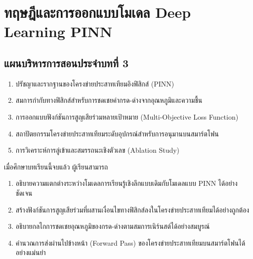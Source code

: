 \chapter{ทฤษฎีและการออกแบบโมเดล Deep Learning PINN}
\label{chap:ch03}

\section*{แผนบริหารการสอนประจำบทที่ 3}

\begin{tcolorbox}[
    enhanced, breakable,
    colback=white, colframe=rbruNavy,
    fonttitle=\bfseries\color{white},
    title={1. หัวข้อเนื้อหาประจำบท},
    arc=1.5mm, boxrule=0.8pt, leftrule=3.5mm
]
\begin{enumerate}
    \item ปรัชญาและรากฐานของโครงข่ายประสาทเทียมอิงฟิสิกส์ (PINN)
    \item สมการกำกับทางฟิสิกส์สำหรับการชดเชยค่ากรด-ด่างจากอุณหภูมิและความชื้น
    \item การออกแบบฟังก์ชันการสูญเสียร่วมหลายเป้าหมาย (Multi-Objective Loss Function)
    \item สถาปัตยกรรมโครงข่ายประสาทเทียมระดับอุปกรณ์สำหรับการอนุมานบนสมาร์ตโฟน
    \item การวิเคราะห์การลู่เข้าและสมรรถนะเชิงตัวเลข (Ablation Study)
\end{enumerate}
\end{tcolorbox}

\begin{tcolorbox}[
    enhanced, breakable,
    colback=white, colframe=rbruNavy,
    fonttitle=\bfseries\color{white},
    title={2. วัตถุประสงค์เชิงพฤติกรรม},
    arc=1.5mm, boxrule=0.8pt, leftrule=3.5mm
]
เมื่อศึกษาบทเรียนนี้จบแล้ว ผู้เรียนสามารถ
\begin{enumerate}
    \item อธิบายความแตกต่างระหว่างโมเดลการเรียนรู้เชิงลึกแบบเดิมกับโมเดลแบบ PINN ได้อย่างชัดเจน
    \item สร้างฟังก์ชันการสูญเสียร่วมที่ผสานเงื่อนไขทางฟิสิกส์ลงในโครงข่ายประสาทเทียมได้อย่างถูกต้อง
    \item อธิบายกลไกการชดเชยอุณหภูมิของกรด-ด่างตามสมการเนิร์นสต์ได้อย่างสมบูรณ์
    \item คำนวณการส่งผ่านไปข้างหน้า (Forward Pass) ของโครงข่ายประสาทเทียมบนสมาร์ตโฟนได้อย่างแม่นยำ
\end{enumerate}
\end{tcolorbox}

